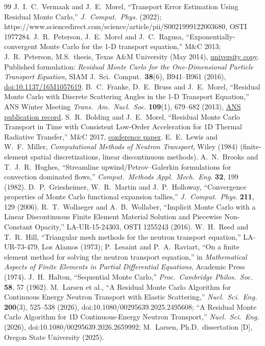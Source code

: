 \documentclass[11pt]{article}
\begin{document}
\begin{thebibliography}{99}
 J.~I.~C.~Vermaak and J.~E.~Morel, ``Transport Error Estimation Using
  Residual Monte Carlo,'' \emph{J.\ Comput.\ Phys.} (2022);
  https://www.sciencedirect.com/science/article/pii/S0021999122003680, OSTI 1977284.
 J.~R.~Peterson, J.~E.~Morel and J.~C.~Ragusa,
  ``Exponentially-convergent Monte Carlo for the 1-D transport equation,'' M\&C 2013;
  J.~R.~Peterson, M.S.\ thesis, Texas A\&M University (May 2014),
  \href{https://oaktrust.library.tamu.edu/bitstreams/69ab2dae-3fef-4daf-96d0-2bd1896d81e3/download}
  {university copy}.
  Published formulation: \emph{Residual Monte Carlo for the One-Dimensional
  Particle Transport Equation}, SIAM J.\ Sci.\ Comput.\ \textbf{38}(6),
  B941--B961 (2016), \href{https://doi.org/10.1137/16M1057619}{doi:10.1137/16M1057619}.
 B.~C.~Franke, D.~E.~Bruss and J.~E.~Morel, ``Residual Monte Carlo with
  Discrete Scattering Angles in the 1-D Transport Equation,'' ANS Winter Meeting
  \emph{Trans.\ Am.\ Nucl.\ Soc.} \textbf{109}(1), 679--682 (2013),
  \href{https://www.ans.org/pubs/transactions/volume-109/}{ANS publication record}.
 S.~R.~Bolding and J.~E.~Morel, ``Residual Monte Carlo Transport in
  Time with Consistent Low-Order Acceleration for 1D Thermal Radiative Transfer,''
  M\&C 2017,
  \href{https://www.kns.org/files/int_paper/paper/MC2017_2017_2/P102S02-03BoldingS.pdf}
  {conference paper}.
 E.~E.~Lewis and W.~F.~Miller, \emph{Computational Methods of Neutron
  Transport}, Wiley (1984) (finite-element spatial discretizations, linear
  discontinuous methods).
 A.~N.~Brooks and T.~J.~R.~Hughes, ``Streamline upwind/Petrov--Galerkin
  formulations for convection dominated flows,'' \emph{Comput.\ Methods Appl.\ Mech.\
  Eng.} \textbf{32}, 199 (1982).
 D.~P.~Griesheimer, W.~R.~Martin and J.~P.~Holloway,
  ``Convergence properties of Monte Carlo functional expansion tallies,''
  \emph{J.\ Comput.\ Phys.} \textbf{211}, 129 (2006).
 R.~T.~Wollaeger and A.~B.~Wollaber, ``Implicit Monte Carlo with a
  Linear Discontinuous Finite Element Material Solution and Piecewise Non-Constant
  Opacity,'' LA-UR-15-24303, OSTI 1255243 (2016).
 W.~H.~Reed and T.~R.~Hill, ``Triangular mesh methods for the neutron
  transport equation,'' LA-UR-73-479, Los Alamos (1973); P.~Lesaint and P.~A.~Raviart,
  ``On a finite element method for solving the neutron transport equation,'' in
  \emph{Mathematical Aspects of Finite Elements in Partial Differential Equations},
  Academic Press (1974).
 J.~H.~Halton, ``Sequential Monte Carlo,'' \emph{Proc.\ Cambridge
  Philos.\ Soc.} \textbf{58}, 57 (1962).
 M.~Larsen et al., ``A Residual Monte Carlo Algorithm for Continuous
  Energy Neutron Transport with Elastic Scattering,'' \emph{Nucl.\ Sci.\ Eng.}
  \textbf{200}(3), 525--538 (2026), doi:10.1080/00295639.2025.2495608;
  ``A Residual Monte Carlo Algorithm for 1D Continuous-Energy
  Neutron Transport,'' \emph{Nucl.\ Sci.\ Eng.} (2026), doi:10.1080/00295639.2026.2659992;
  M.~Larsen, Ph.D.\ dissertation [D], Oregon State University (2025).
\end{thebibliography}
\end{document}
